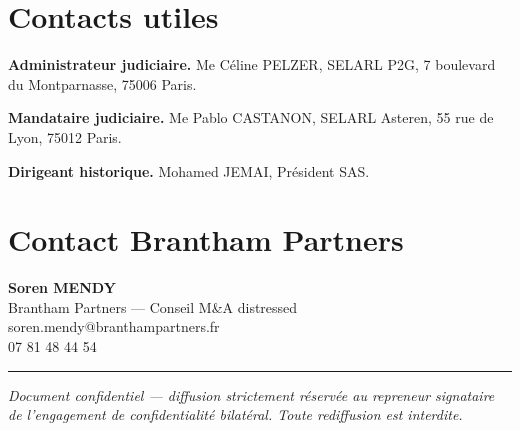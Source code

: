 \documentclass[11pt,a4paper]{article}
\begin{document}
\section{Contacts utiles}

\textbf{Administrateur judiciaire.} Me Céline PELZER, SELARL P2G, 7 boulevard du Montparnasse, 75006 Paris.

\textbf{Mandataire judiciaire.} Me Pablo CASTANON, SELARL Asteren, 55 rue de Lyon, 75012 Paris.

\textbf{Dirigeant historique.} Mohamed JEMAI, Président SAS.

\section{Contact Brantham Partners}

\textbf{Soren MENDY}\\
Brantham Partners --- Conseil M\&A distressed\\
soren.mendy@branthampartners.fr\\
07 81 48 44 54

\vspace{1em}
\hrule
\vspace{1em}

\begin{center}
\footnotesize \itshape
Document confidentiel --- diffusion strictement réservée au repreneur signataire de l'engagement de confidentialité bilatéral. Toute rediffusion est interdite.
\end{center}
\end{document}
